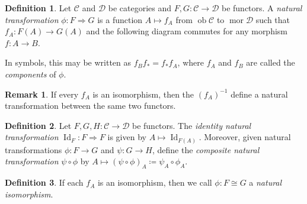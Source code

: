 \documentclass[10pt,letterpaper,cm]{nupset}
\theoremstyle{definition}
\newtheorem*{definition}{Definition}
\newtheorem{remark}{Remark}
\newcommand{\1}{\mathbf{1}}
\renewcommand{\c}{\mathscr{C}}
\renewcommand{\d}{\mathscr{D}}
\newcommand{\0}{\vec 0}
\DeclareMathOperator{\id}{Id}
\DeclareMathOperator{\ob}{ob}
\DeclareMathOperator{\mor}{mor}
\begin{document}
\begin{abstract}
More basic category theory. The main sources for this talk are the following.
\begin{itemize}
\item \textit{nLab}.
\item John Rognes's \textit{Lecture Notes on Algebraic K-Theory}, Ch. 3.
\item Peter Johnstone's lecture notes for ``Category Theory" (Mathematical Tripos Part III, Michaelmas 2015), Ch. 1.
\end{itemize}
\end{abstract}

\begin{definition}
Let $\c$ and $\d$ be categories and $F,G: \c \to \d$ be functors.  A \textit{natural transformation} $\phi :F \Rightarrow G$  is a function $A \mapsto f_A$ from $\ob \c$ to $\mor \d$ such that $f_A : F(A) \to G(A)$ and the following diagram commutes for any morphism $f: A \to B$.

\begin{center}
\end{center}
In symbols, this may be written as $f_Bf_{\ast} = f_{\ast}f_A$, where $f_A$ and $f_B$ are called the \textit{components} of $\phi$.
\end{definition}

\begin{remark}
If every $f_A$ is an isomorphism, then the $(f_A)^{-1}$ define a natural transformation between the same two functors.
\end{remark}

\begin{definition}
Let $F, G, H: \c \to \d$ be functors. The \textit{identity natural transformation} $\id_F : F \Rightarrow F$ is given by $A \mapsto \id_{F(A)}$. Moreover, given natural transformations $\phi: F \to G$ and $\psi: G \to H$, define the \textit{composite natural transformation} $\psi \circ \phi$ by $A \mapsto (\psi \circ \phi)_A \coloneqq \psi_{A} \circ \phi_{A}$.
\end{definition}


\begin{definition}
If each $f_A$ is an isomorphism, then we call $\phi: F \cong G$ a \textit{natural isomorphism}.
\end{definition}
\end{document}
